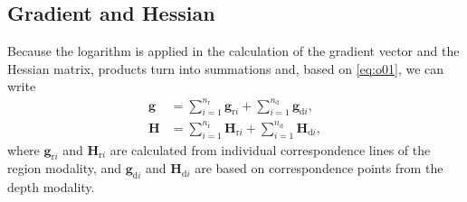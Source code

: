 \documentclass[10pt,twocolumn,letterpaper]{article}
\begin{document}
\subsection{Gradient and Hessian}\label{ssec:o1}
Because the logarithm is applied in the calculation of the gradient vector and the Hessian matrix, products turn into summations and, based on \cref{eq:o01}, we can write
\begin{align}\label{eq:o10}
	\pmb{g} &= \sum_{i=1}^{n_\textrm{r}}\pmb{g}_{\textrm{r}i}
	+ \sum_{i=1}^{n_\textrm{d}}\pmb{g}_{\textrm{d}i},\\\label{eq:o11}
	\pmb{H} &= \sum_{i=1}^{n_\textrm{r}}\pmb{H}_{\textrm{r}i}
	+ \sum_{i=1}^{n_\textrm{d}}\pmb{H}_{\textrm{d}i},
\end{align}
where $\pmb{g}_{\textrm{r}i}$ and $\pmb{H}_{\textrm{r}i}$ are calculated from individual correspondence lines of the region modality, and $\pmb{g}_{\textrm{d}i}$ and $\pmb{H}_{\textrm{d}i}$ are based on correspondence points from the depth modality.
\end{document}
